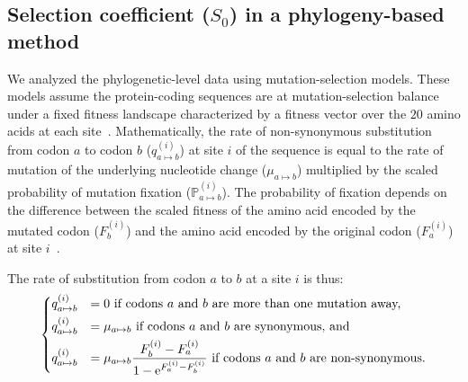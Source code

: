 \documentclass{article}
\newcommand{\e}{\text{e}}
\newcommand{\proba}{\mathbb{P}}
\newcommand{\Sphy}{S_{0}}
\begin{document}
    \subsection{Selection coefficient ($\Sphy$) in a phylogeny-based method}
    \label{subsec:s-phylogeny-method}

    We analyzed the phylogenetic-level data using mutation-selection models.
    These models assume the protein-coding sequences are at mutation-selection balance under a fixed fitness landscape characterized by a fitness vector over the $20$ amino acids at each site~\cite{yang_mutationselection_2008, halpern_evolutionary_1998, rodrigue_mechanistic_2010}.
    Mathematically, the rate of non-synonymous substitution from codon $a$ to codon $b$ ($q_{a \mapsto b}^{(i)}$) at site $i$ of the sequence is equal to the rate of mutation of the underlying nucleotide change ($\mu_{a \mapsto b}$) multiplied by the scaled probability of mutation fixation ($\proba_{a \mapsto b}^{(i)}$).
    The probability of fixation depends on the difference between the scaled fitness of the amino acid encoded by the mutated codon ($F_b^{(i)}$) and the amino acid encoded by the original codon ($F_a^{(i)}$) at site $i$~\cite{wright_evolution_1931, fisher_genetical_1930}.

    The rate of substitution from codon $a$ to $b$ at a site $i$ is thus:
    \begin{equation}
        \begin{dcases}
            q_{a \mapsto b}^{(i)} & = 0 \text{ if codons $a$ and $b$ are more than one mutation away,} \\
            q_{a \mapsto b}^{(i)} & = \mu_{a \mapsto b} \text{ if codons $a$ and $b$ are synonymous, and}\\
            q_{a \mapsto b}^{(i)} & = \mu_{a \mapsto b} \dfrac{F_b^{(i)} - F_a^{(i)}}{1 - \e^{F_a^{(i)} - F_b^{(i)}}} \text{ if codons $a$ and $b$ are non-synonymous}.
        \end{dcases}
    \end{equation}
\end{document}
